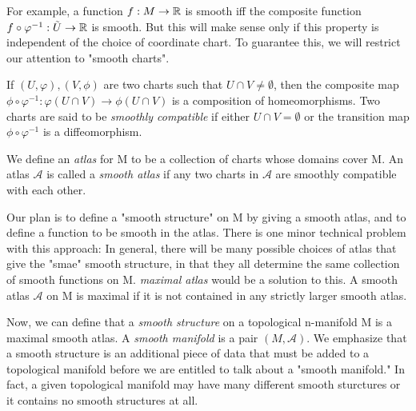 For example, a function $f:M\rightarrow\mathbb{R}$ is smooth iff the composite function 
$f\circ\varphi^{-1}:\tilde{U}\rightarrow\mathbb{R}$ is smooth. But this will make sense only if
this property is independent of the choice of coordinate chart. To guarantee this, we
will restrict our attention to "smooth charts".

If $(U,\varphi),(V,\phi)$ are two charts such that $U\cap V\neq \emptyset$, then the 
composite map $\phi\circ\varphi^{-1}:\varphi(U\cap V)\rightarrow\phi(U\cap V)$ is a 
composition of homeomorphisms. Two charts are said to be \emph{smoothly compatible} if
either $U\cap V = \emptyset$ or the transition map $\phi\circ\varphi^{-1}$ is a diffeomorphism.

We define an \emph{atlas} for M to be a collection of charts whose domains cover M.
An atlas $\mathcal{A}$ is called a \emph{smooth atlas} if any two charts in $\mathcal{A}$
are smoothly compatible with each other.

Our plan is to define a "smooth structure" on M by giving a smooth atlas, and to define a 
function to be smooth in the atlas. There is one minor technical problem with this approach:
In general, there will be many possible choices of atlas that give the "smae" smooth 
structure, in that they all determine the same collection of smooth functions on M.
\emph{maximal atlas} would be a solution to this. A smooth atlas $\mathcal{A}$ on M is 
maximal if it is not contained in any strictly larger smooth atlas.

Now, we can define that a \emph{smooth structure} on a topological n-manifold M is a maximal
smooth atlas. A \emph{smooth manifold} is a pair $(M,\mathcal{A})$. We emphasize that a
smooth structure is an additional piece of data that must be added to a topological manifold
before we are entitled to talk about a "smooth manifold." In fact, a given topological manifold
may have many different smooth sturctures or it contains no smooth structures at all.

